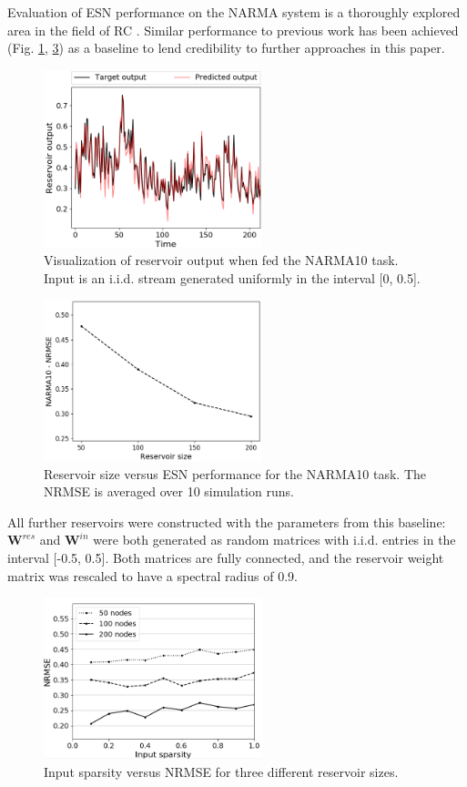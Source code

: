 Evaluation of ESN performance on the NARMA system is a thoroughly explored area
in the field of RC \cite{verstraeten_experimental_2007, rodan_minimum_2011,
jaeger_adaptive_nodate}. Similar performance to previous work has been achieved
(Fig. \ref{visualization}, \ref{performance}) as a baseline to lend credibility
to further approaches in this paper.

\begin{figure}[H]
  \centering
  \includegraphics[width=2.5in]{img/narma_visualization.png}
  \caption{
    Visualization of reservoir output when fed the NARMA10 task. Input is an
i.i.d. stream generated uniformly in the interval [0, 0.5].
  }
  \label{visualization}
\end{figure}

\begin{figure}[H]
  \centering
  \includegraphics[width=2.5in]{img/general_performance.png}
  \caption{
    Reservoir size versus ESN performance for the NARMA10 task. The NRMSE is
averaged over 10 simulation runs.
  }
  \label{performance}
\end{figure}

All further reservoirs were constructed with the parameters from this baseline:
$\mathbf{W}^{res}$ and $\mathbf{W}^{in}$ were both generated as random matrices
with i.i.d. entries in the interval [-0.5, 0.5]. Both matrices are fully
connected, and the reservoir weight matrix was rescaled to have a spectral
radius of 0.9.

\begin{figure}[H]
  \centering
  \includegraphics[width=2.5in]{img/input_sparsity_all.png}
  \caption{
    Input sparsity versus NRMSE for three different reservoir sizes.
  }
  \label{performance}
\end{figure}

